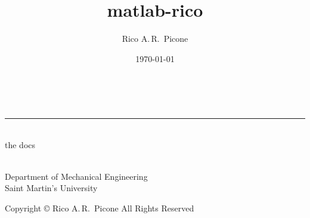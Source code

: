 \title{matlab-rico}
\author{Rico A.\,R.\ Picone}
\date{\mydate\today{}}
\makeatletter
\begin{center}

{\bfseries\ttfamily\HUGE\@title}\\[-.5\baselineskip]
\rule{4cm}{0.4pt}\\[.4\baselineskip] 
{\sffamily\huge the docs}

\vspace{5\baselineskip}
\@author\\
Department of Mechanical Engineering\\
Saint Martin's University
\end{center}
\makeatother
\thispagestyle{empty}

\vspace{4\baselineskip}
\begin{center}
Copyright \copyright{} \the\year{} Rico A.\,R.\ Picone All Rights Reserved
\end{center}

\newpage
\begin{KeepFromToc}
  \tableofcontents*
\end{KeepFromToc}
